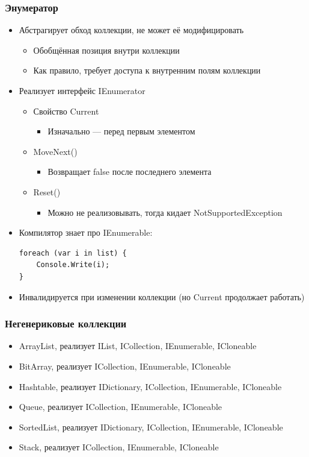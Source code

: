 \documentclass[xetex,mathserif,serif]{beamer}
\begin{document}
	\begin{frame}[fragile]
		\frametitle{Энумератор}
		\begin{itemize}
			\item Абстрагирует обход коллекции, не может её модифицировать
			\begin{itemize}
				\item Обобщённая позиция внутри коллекции
				\item Как правило, требует доступа к внутренним полям коллекции
			\end{itemize}
			\item Реализует интерфейс IEnumerator
			\begin{itemize}
				\item Свойство Current
				\begin{itemize}
					\item Изначально --- перед первым элементом
				\end{itemize}
				\item MoveNext()
				\begin{itemize}
					\item Возвращает false после последнего элемента
				\end{itemize}
				\item Reset()
				\begin{itemize}
					\item Можно не реализовывать, тогда кидает NotSupportedException
				\end{itemize}
			\end{itemize}
			\item Компилятор знает про IEnumerable:
			\begin{verbatim}
foreach (var i in list) { 
    Console.Write(i); 
}
			\end{verbatim}
			\item Инвалидируется при изменении коллекции (но Current продолжает работать)
		\end{itemize}
	\end{frame}

	\begin{frame}
		\frametitle{Негенериковые коллекции}
		\begin{itemize}
			\item ArrayList, реализует IList, ICollection, IEnumerable, ICloneable
			\item BitArray,  реализует ICollection, IEnumerable, ICloneable
			\item Hashtable, реализует IDictionary, ICollection, IEnumerable, ICloneable
			\item Queue, реализует ICollection, IEnumerable, ICloneable
			\item SortedList, реализует IDictionary, ICollection, IEnumerable, ICloneable
			\item Stack, реализует ICollection, IEnumerable, ICloneable
		\end{itemize}
	\end{frame}
\end{document}
